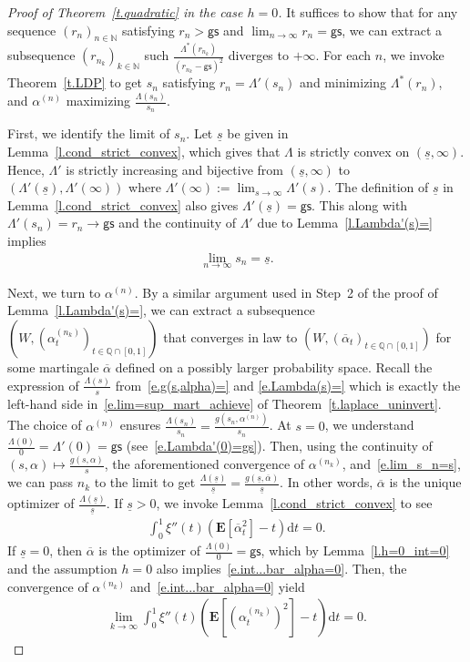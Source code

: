 \documentclass[11pt]{amsart}
\theoremstyle{remark}
\theoremstyle{definition}
\numberwithin{equation}{section}
\numberwithin{proposition}{section}
\numberwithin{figure}{section}
\numberwithin{table}{section}
\newcommand{\N}{\mathbb{N}}
\newcommand{\Q}{\mathbb{Q}}
\newcommand{\EE}{\mathbf{E}}
\renewcommand{\bar}{\overline}
\newcommand{\Ll}{\left}
\newcommand{\Rr}{\right}
\renewcommand{\d}{\mathrm{d}}
\newcommand{\1}{\mathbf{1}}
\newcommand{\msf}{\mathsf}
\newcommand{\pnp}{{(n)}}
\newcommand{\gs}{\msf {gs}}
\begin{document}
\begin{proof}[Proof of Theorem~\ref{t.quadratic} in the case $h=0$]

It suffices to show that for any sequence $(r_n)_{n\in\N}$ satisfying $r_n>\gs$ and $\lim_{n\to\infty}r_n=\gs$, we can extract a subsequence $(r_{n_k})_{k\in\N}$ such $\frac{\Lambda^*(r_{n_k})}{(r_{n_k}-\gs)^2}$ diverges to $+\infty$. For each $n$, we invoke Theorem~\ref{t.LDP} to get $s_n$ satisfying $r_n=\Lambda'(s_n)$ and minimizing $\Lambda^*(r_n)$, and $\alpha^\pnp$ maximizing $\frac{\Lambda(s_n)}{s_n}$.

First, we identify the limit of $s_n$.
Let $\underline s$ be given in Lemma~\ref{l.cond_strict_convex}, which gives that $\Lambda$ is strictly convex on $(\underline s,\infty)$. Hence, $\Lambda'$ is strictly increasing and bijective from $(\underline s,\infty)$ to $(\Lambda'(\underline s), \Lambda'(\infty))$ where $\Lambda'(\infty):=\lim_{s\to\infty}\Lambda'(s)$. The definition of $\underline s$ in Lemma~\ref{l.cond_strict_convex} also gives $\Lambda'(\underline s)=\gs$. This along with $\Lambda'(s_n)=r_n\to \gs$ and the continuity of $\Lambda'$ due to Lemma~\ref{l.Lambda'(s)=} implies
\begin{align}\label{e.lim_s_n=s}
    \lim_{n\to\infty}s_n=\underline s.
\end{align}

Next, we turn to $\alpha^\pnp$. By a similar argument used in Step~2 of the proof of Lemma~\ref{l.Lambda'(s)=}, we can extract a subsequence $(W,(\alpha^{(n_k)}_t)_{t\in\Q\cap[0,1]})$ that converges in law to $(W,(\bar\alpha_t)_{t\in\Q\cap[0,1]})$ for some martingale $\bar\alpha$ defined on a possibly larger probability space. Recall the expression of $\frac{\Lambda(s)}{s}$ from~\eqref{e.g(s,alpha)=} and \eqref{e.Lambda(s)=} which is exactly the left-hand side in~\eqref{e.lim=sup_mart_achieve} of Theorem~\ref{t.laplace_uninvert}. The choice of $\alpha^\pnp$ ensures $\frac{\Lambda(s_n)}{s_n}=\frac{g(s_n,\alpha^\pnp)}{s_n}$. At $s=0$, we understand $\frac{\Lambda(0)}{0}=\Lambda'(0)=\gs$ (see~\eqref{e.Lambda'(0)=gs}). Then, using the continuity of $(s,\alpha)\mapsto\frac{g(s,\alpha)}{s}$, the aforementioned convergence of $\alpha^{(n_k)}$, and~\eqref{e.lim_s_n=s}, we can pass $n_k$ to the limit to get $\frac{\Lambda(\underline s)}{\underline s} = \frac{g(\underline s,\bar\alpha)}{\underline s}$. In other words, $\bar\alpha$ is the unique optimizer of $\frac{\Lambda(\underline s)}{\underline s}$. 
If $\underline s>0$, we invoke Lemma~\ref{l.cond_strict_convex} to see
\begin{align}\label{e.int...bar_alpha=0}
    \int_0^1\xi''(t)\Ll(\EE\Ll[\bar\alpha^2_t\Rr]-t\Rr)\d t =0.
\end{align}
If $\underline s =0$, then $\bar\alpha$ is the optimizer of $\frac{\Lambda(0)}{0}=\gs$, which by Lemma~\ref{l.h=0_int=0} and  the assumption $h=0$ also implies~\eqref{e.int...bar_alpha=0}. Then, the convergence of $\alpha^{(n_k)}$ and~\eqref{e.int...bar_alpha=0} yield
\begin{align*}
    \lim_{k\to\infty}\int_0^1\xi''(t)\Ll(\EE\Ll[\Ll(\alpha^{(n_k)}_t\Rr)^2\Rr]-t\Rr)\d t =0.
\end{align*}


\end{proof}
\end{document}
